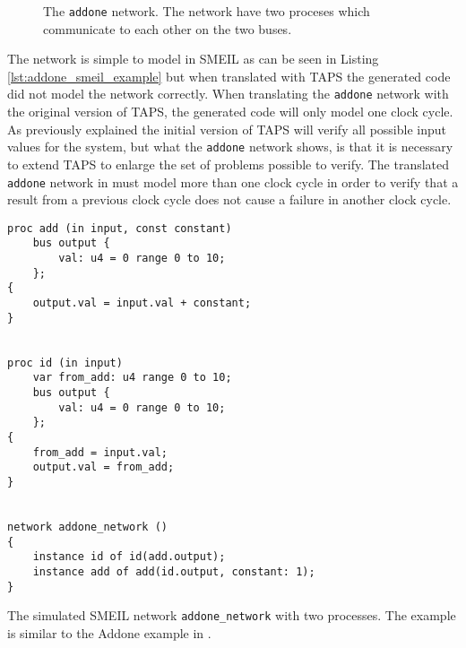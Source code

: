 \begin{figure}
    \centering
    \caption{The \texttt{addone} network. The network have two proceses which communicate to each other on the two buses.}
    \label{fig:addone_unclocked}
\end{figure}
The network is simple to model in SMEIL as can be seen in Listing \ref{lst:addone_smeil_example} but when translated with TAPS the generated \cspm{} code did not model the network correctly. When translating the \texttt{addone} network with the original version of TAPS, the generated \cspm{} code will only model one clock cycle. As previously explained %
the initial version of TAPS will verify all possible input values for the system, but what the \texttt{addone} network shows, is that it is necessary to extend TAPS to enlarge the set of problems possible to verify. The translated \texttt{addone} network in \cspm{} must model more than one clock cycle in order to verify that a result from a previous clock cycle does not cause a failure in another clock cycle.
\begin{listing}
\begin{verbatim}
proc add (in input, const constant)
    bus output {
        val: u4 = 0 range 0 to 10;
    };
{
    output.val = input.val + constant;
}


proc id (in input)
    var from_add: u4 range 0 to 10;
    bus output {
        val: u4 = 0 range 0 to 10;
    };
{
    from_add = input.val;
    output.val = from_add;
}


network addone_network ()
{
    instance id of id(add.output);
    instance add of add(id.output, constant: 1);
}
\end{verbatim}
\caption{The simulated SMEIL network \texttt{addone\_network} with two processes. The example is similar to the Addone example in \cite{smeil}.}
\label{lst:addone_smeil_example}
\end{listing}
